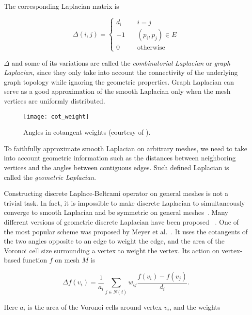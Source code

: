 The corresponding Laplacian matrix is

\begin{equation}
\Delta(i,j)=\left\{
    \begin{array}{lc}
    d_i\quad & i=j \\
    -1\quad & (p_i,p_j)\in E \\
    0\quad & \text{otherwise}
    \end{array}
\right.
\end{equation}

$\Delta$ and some of its variations are called the \emph{combinatorial Laplacian}
or \emph{graph Laplacian}, since they only take into account the connectivity 
of the underlying graph topology while ignoring the geometric properties. 
Graph Laplacian can serve as a good approximation of the smooth Laplacian only
when the mesh vertices are uniformly distributed.

\begin{figure}
  \centering
  \texttt{[image: cot\_weight]}
  \caption[Angles in cotangent weights]{Angles in cotangent weights (courtesy of \cite{Sorkine:EG:2005}).}
\label{fig:cotweights}
\end{figure}

To faithfully approximate smooth Laplacian on arbitrary meshes, we need to take
into account geometric information such as the distances between neighboring
vertices and the angles between contiguous edges. Such defined Laplacian is
called the \emph{geometric Laplacian}.

Constructing discrete Laplace-Beltrami operator on general meshes is not a trivial task.
In fact, it is impossible to make discrete Laplacian to simultaneously converge to smooth
Laplacian and be symmetric on general meshes~\cite{Rustamov:2007:LEF}. Many different
versions of geometric discrete Laplacian have been proposed
~\cite{pinkall1993computing, Desbrun1999, Xu:2004:GMP, Levy2006, Vallet2008, Belkin:2008:SCG}.
One of the most popular scheme was proposed by Meyer et al.~\cite{Meyer2003}.
It uses the cotangents of the two angles opposite to an edge to weight the edge,
and the area of the Voronoi cell size surrounding a vertex to weight the vertex.
Its action on vertex-based function $f$ on mesh $M$ is

\begin{equation}
\Delta f(v_i)=\frac{1}{a_i}\sum_{j\in N(i)}w_{ij}\frac{f(v_i)-f(v_j)}{d_i}.
\end{equation}

Here $a_i$ is the area of the Voronoi cells around vertex $v_i$, and the weights

